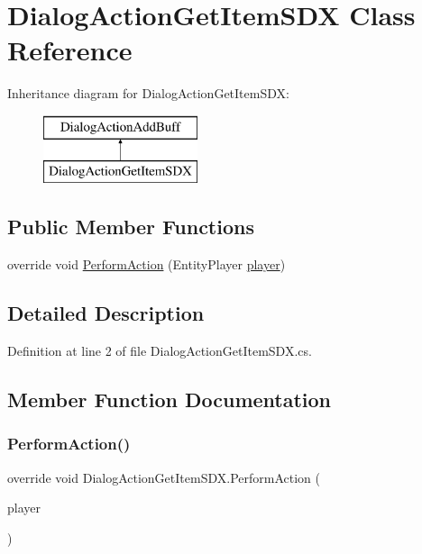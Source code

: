 \hypertarget{class_dialog_action_get_item_s_d_x}{}\section{Dialog\+Action\+Get\+Item\+S\+DX Class Reference}
\label{class_dialog_action_get_item_s_d_x}
Inheritance diagram for Dialog\+Action\+Get\+Item\+S\+DX\+:\begin{figure}[H]
\begin{center}
\leavevmode
\includegraphics[height=2.000000cm]{d3/d6f/class_dialog_action_get_item_s_d_x}
\end{center}
\end{figure}
\subsection*{Public Member Functions}
\begin{DoxyCompactItemize}
\item 
override void \mbox{\hyperlink{class_dialog_action_get_item_s_d_x_a838e83a5b2d3723df1aeafb3367b0175}{Perform\+Action}} (Entity\+Player \mbox{\hyperlink{_sphere_i_i_01_music_01_boxes_2_config_2_localization_8txt_a4e2cb8aeff651600ea1cc57fe5a929a4}{player}})
\end{DoxyCompactItemize}


\subsection{Detailed Description}


Definition at line 2 of file Dialog\+Action\+Get\+Item\+S\+D\+X.\+cs.



\subsection{Member Function Documentation}
\mbox{\label{class_dialog_action_get_item_s_d_x_a838e83a5b2d3723df1aeafb3367b0175}} 
\subsubsection{\texorpdfstring{PerformAction()}{PerformAction()}}
{\footnotesize\ttfamily override void Dialog\+Action\+Get\+Item\+S\+D\+X.\+Perform\+Action (\begin{DoxyParamCaption}\item[{Entity\+Player}]{player }\end{DoxyParamCaption})}



